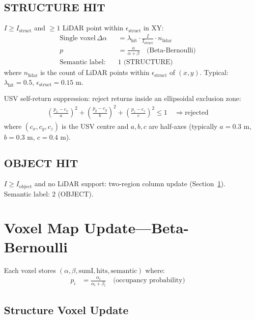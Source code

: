 \documentclass[10pt,twocolumn]{article}
\begin{document}
\subsection{STRUCTURE HIT}
$I \geq I_{\text{struct}}$ and $\geq 1$ LiDAR point within $\epsilon_{\text{struct}}$ in XY:
\begin{align}
\text{Single voxel} \, \Delta\alpha &= \lambda_{\text{hit}} \cdot \frac{I}{I_{\text{struct}}} \cdot n_{\text{lidar}} \label{eq:struct_update} \\
p &= \frac{\alpha}{\alpha + \beta} \quad \text{(Beta-Bernoulli)} \\
\text{Semantic label:} \quad &1 \text{ (STRUCTURE)}
\end{align}
where $n_{\text{lidar}}$ is the count of LiDAR points within $\epsilon_{\text{struct}}$ of $(x,y)$. Typical: $\lambda_{\text{hit}} = 0.5$, $\epsilon_{\text{struct}} = 0.15$ m.

USV self-return suppression: reject returns inside an ellipsoidal exclusion zone:
\begin{align}
\left(\frac{p_x - c_x}{a}\right)^2 + \left(\frac{p_y - c_y}{b}\right)^2 + \left(\frac{p_z - c_z}{c}\right)^2 \leq 1 \quad \Rightarrow \text{rejected}
\end{align}
where $(c_x, c_y, c_z)$ is the USV centre and $a, b, c$ are half-axes (typically $a=0.3$ m, $b=0.3$ m, $c=0.4$ m).

\subsection{OBJECT HIT}
$I \geq I_{\text{object}}$ and no LiDAR support: two-region column update (Section~\ref{sec:voxel_update}). Semantic label: $2$ (OBJECT).

\section{Voxel Map Update---Beta-Bernoulli} \label{sec:voxel_update}

Each voxel stores $(\alpha, \beta, \text{sumI}, \text{hits}, \text{semantic})$ where:
\begin{align}
p_i &= \frac{\alpha_i}{\alpha_i + \beta_i} \quad \text{(occupancy probability)}
\end{align}

\subsection{Structure Voxel Update}
\end{document}
